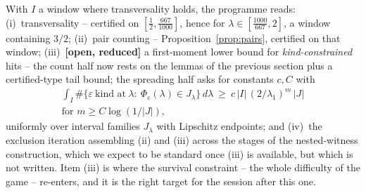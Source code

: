 \documentclass[11pt]{amsart}
\theoremstyle{remark}\newtheorem{remark}[lemma]{Remark}
\begin{document}
With $I$ a window where transversality holds, the programme reads:
(i)~transversality -- certified on $[\tfrac12,\tfrac{667}{1000}]$, hence for
$\lambda\in[\tfrac{1000}{667},2]$, a window containing $3/2$;
(ii)~pair counting -- Proposition~\ref{prop:pairs}, certified on that window;
(iii)~\textbf{[open, reduced]} a first-moment lower bound for
\emph{kind-constrained} hits -- the count half now rests on the lemmas of the
previous section plus a certified-type tail bound; the spreading half asks for
constants $c,C$ with
\begin{multline*}
\int_I\#\{\varepsilon\ \text{kind at}\ \lambda:\ \Phi_\varepsilon(\lambda)\in
J_\lambda\}\,d\lambda\ \geq\ c\,|I|\,(2/\lambda_1)^m\,|J|\\
\text{for }m\geq C\log(1/|J|),
\end{multline*}
uniformly over interval families $J_\lambda$ with Lipschitz endpoints; and
(iv)~the exclusion iteration assembling (ii) and (iii) across the stages of
the nested-witness construction, which we expect to be standard once (iii) is
available, but which is not written. Item (iii) is where the survival
constraint -- the whole difficulty of the game -- re-enters, and it is the
right target for the session after this one.
\end{document}
